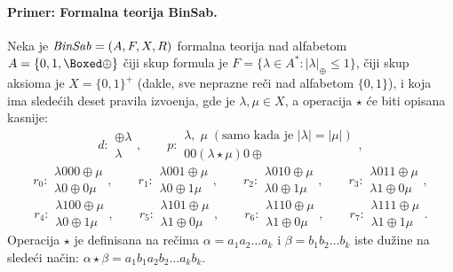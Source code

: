 \paragraph{Primer: Formalna teorija BinSab.}
Neka je $\mathit{BinSab} = (A, F, X, R)$ formalna teorija nad alfabetom $A = \{0, 1, \Boxed\oplus\}$ \v ciji skup formula
je $F = \{\lambda \in A^* : |\lambda|_\oplus \le 1\}$, \v ciji skup aksioma je $X = \{0,1\}^+$ (dakle, sve neprazne re\v ci
nad alfabetom $\{0, 1\}$), i koja ima slede\'cih deset pravila izvo\dj enja, gde je $\lambda, \mu \in X$, a operacija
$\star$ \'ce biti opisana kasnije:
$$
  d : \begin{array}{c}
    \oplus \lambda\\ \hline
    \lambda
  \end{array},\qquad
  p : \begin{array}{c}
    \lambda, \; \mu \; (\text{samo kada je } |\lambda| = |\mu|) \\ \hline
    00 (\lambda \star \mu) 0 \oplus
  \end{array},
$$
$$
  r_0 : \begin{array}{c}
    \lambda 000 \oplus \mu\\ \hline
    \lambda 0 \oplus 0 \mu
  \end{array}, \qquad
  r_1 : \begin{array}{c}
    \lambda 001 \oplus \mu\\ \hline
    \lambda 0 \oplus 1 \mu
  \end{array}, \qquad
  r_2 : \begin{array}{c}
    \lambda 010 \oplus \mu\\ \hline
    \lambda 0 \oplus 1 \mu
  \end{array}, \qquad
  r_3 : \begin{array}{c}
    \lambda 011 \oplus \mu\\ \hline
    \lambda 1 \oplus 0 \mu
  \end{array},
$$
$$
  r_4 : \begin{array}{c}
    \lambda 100 \oplus \mu\\ \hline
    \lambda 0 \oplus 1 \mu
  \end{array}, \qquad
  r_5 : \begin{array}{c}
    \lambda 101 \oplus \mu\\ \hline
    \lambda 1 \oplus 0 \mu
  \end{array},\qquad
  r_6 : \begin{array}{c}
    \lambda 110 \oplus \mu\\ \hline
    \lambda 1 \oplus 0 \mu
  \end{array}, \qquad
  r_7 : \begin{array}{c}
    \lambda 111 \oplus \mu\\ \hline
    \lambda 1 \oplus 1 \mu
  \end{array}.
$$
Operacija $\star$ je definisana na re\v cima $\alpha = a_1 a_2 \ldots a_k$ i $\beta = b_1 b_2 \ldots b_k$
iste du\v zine na slede\'ci na\v cin:
$
  \alpha \star \beta = a_1 b_1 a_2 b_2 \ldots a_k b_k
$.


